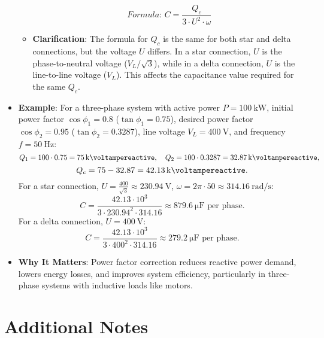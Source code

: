 \documentclass[12pt]{article}
\newcommand{\formula}[1]{\textit{Formula: }#1}
\begin{document}
\begin{itemize}
\begin{itemize}
                \[
                \formula{C = \frac{Q_c}{3 \cdot U^2 \cdot \omega}}
                \]
            \item \textbf{Clarification}: The formula for \(Q_c\) is the same for both star and delta connections, but the voltage \(U\) differs. In a star connection, \(U\) is the phase-to-neutral voltage (\(V_L / \sqrt{3}\)), while in a delta connection, \(U\) is the line-to-line voltage (\(V_L\)). This affects the capacitance value required for the same \(Q_c\).
        \end{itemize}
    \item \textbf{Example}: For a three-phase system with active power \(P = \SI{100}{\kilo\watt}\), initial power factor \(\cos \phi_1 = 0.8\) (\(\tan \phi_1 = 0.75\)), desired power factor \(\cos \phi_2 = 0.95\) (\(\tan \phi_2 = 0.3287\)), line voltage \(V_L = \SI{400}{\volt}\), and frequency \(f = \SI{50}{\hertz}\):
        \[
        Q_1 = 100 \cdot 0.75 = \SI{75}{\kilo\voltampereactive}, \quad Q_2 = 100 \cdot 0.3287 = \SI{32.87}{\kilo\voltampereactive},
        \]
        \[
        Q_c = 75 - 32.87 = \SI{42.13}{\kilo\voltampereactive}.
        \]
        For a star connection, \(U = \frac{400}{\sqrt{3}} \approx \SI{230.94}{\volt}\), \(\omega = 2 \pi \cdot 50 \approx \SI{314.16}{\radian\per\second}\):
        \[
        C = \frac{42.13 \cdot 10^3}{3 \cdot 230.94^2 \cdot 314.16} \approx \SI{879.6}{\micro\farad} \text{ per phase}.
        \]
        For a delta connection, \(U = \SI{400}{\volt}\):
        \[
        C = \frac{42.13 \cdot 10^3}{3 \cdot 400^2 \cdot 314.16} \approx \SI{279.2}{\micro\farad} \text{ per phase}.
        \]
    \item \textbf{Why It Matters}: Power factor correction reduces reactive power demand, lowers energy losses, and improves system efficiency, particularly in three-phase systems with inductive loads like motors.
\end{itemize}
\section{Additional Notes}
\end{document}
